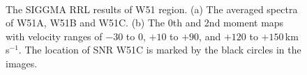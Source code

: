 \documentclass[manuscript]{aastex61}
\newcommand{\kms}{\,km\,s$^{-1}$}
\begin{document}
\begin{figure}[htbp]
\centering
{}
\\
\caption{The SIGGMA RRL results of W51 region. (a) The averaged spectra of W51A, W51B and W51C. (b) The 0th and 2nd moment maps with velocity ranges of $-30$ to $0$, $+10$ to $+90$, and $+120$ to $+150$\kms. The location of SNR W51C is marked by the black circles in the images.}\label{w51_rrl}
\end{figure}
\end{document}
